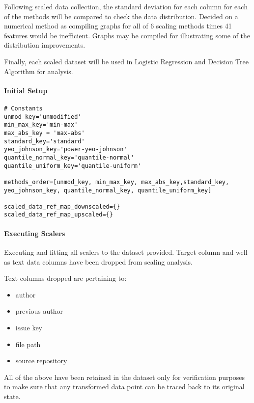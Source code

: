 Following scaled data collection, the standard deviation for each column for each of the methods will be compared to check the data distribution. Decided on a numerical method as compiling graphs for all of 6 scaling methods times 41 features would be inefficient. Graphs may be compiled for illustrating some of the distribution improvements.

Finally, each scaled dataset will be used in Logistic Regression and Decision Tree Algorithm for analysis.
\paragraph{Initial Setup}
\begin{code}
\label{code:scalers:setup}
\begin{verbatim}
# Constants
unmod_key='unmodified'
min_max_key='min-max'
max_abs_key = 'max-abs'
standard_key='standard'
yeo_johnson_key='power-yeo-johnson'
quantile_normal_key='quantile-normal'
quantile_uniform_key='quantile-uniform'

methods_order=[unmod_key, min_max_key, max_abs_key,standard_key, yeo_johnson_key, quantile_normal_key, quantile_uniform_key]

scaled_data_ref_map_downscaled={}
scaled_data_ref_map_upscaled={}
\end{verbatim}
\end{code}
\paragraph{Executing Scalers}
Executing and fitting all scalers to the dataset provided. Target column and well as text data columns have been dropped from scaling analysis.

Text columns dropped are pertaining to:
\begin{itemize}
    \item author
    \item previous author
    \item issue key
    \item file path
    \item source repository
\end{itemize}

All of the above have been retained in the dataset only for verification purposes to make sure that any transformed data point can be traced back to its original state.

